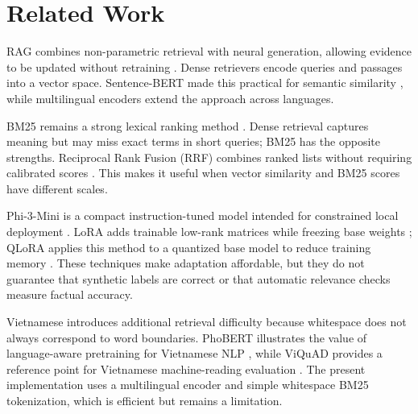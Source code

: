 \documentclass[12pt,a4paper,oneside]{report}
\begin{document}
\section{Related Work}
RAG combines non-parametric retrieval with neural generation, allowing evidence
to be updated without retraining \cite{lewis2020rag}. Dense retrievers encode
queries and passages into a vector space. Sentence-BERT made this practical for
semantic similarity \cite{reimers2019sbert}, while multilingual encoders extend
the approach across languages.

BM25 remains a strong lexical ranking method \cite{robertson2009bm25}. Dense
retrieval captures meaning but may miss exact terms in short queries; BM25 has
the opposite strengths. Reciprocal Rank Fusion (RRF) combines ranked lists
without requiring calibrated scores \cite{cormack2009rrf}. This makes it useful
when vector similarity and BM25 scores have different scales.

Phi-3-Mini is a compact instruction-tuned model intended for constrained local
deployment \cite{phi3technical2024}. LoRA adds trainable low-rank matrices while
freezing base weights \cite{hu2022lora}; QLoRA applies this method to a quantized
base model to reduce training memory \cite{dettmers2023qlora}. These techniques
make adaptation affordable, but they do not guarantee that synthetic labels are
correct or that automatic relevance checks measure factual accuracy.

Vietnamese introduces additional retrieval difficulty because whitespace does
not always correspond to word boundaries. PhoBERT illustrates the value of
language-aware pretraining for Vietnamese NLP \cite{nguyen2020phobert}, while
ViQuAD provides a reference point for Vietnamese machine-reading evaluation
\cite{viquad2020}. The present implementation uses a multilingual encoder and
simple whitespace BM25 tokenization, which is efficient but remains a limitation.
\end{document}
